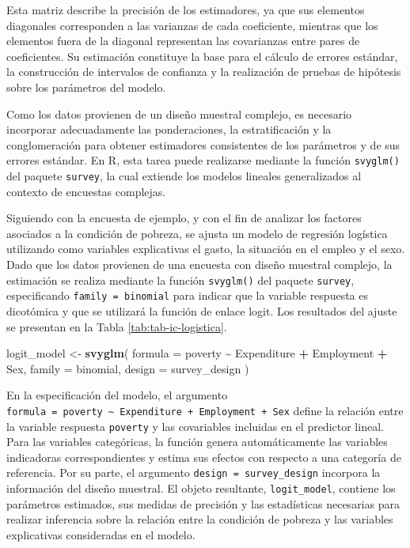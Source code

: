 \documentclass[
  spanish,
  12pt,
]{book}
\newenvironment{Shaded}{\begin{snugshade}}{\end{snugshade}}
\newcommand{\AttributeTok}[1]{\textcolor[rgb]{0.13,0.29,0.53}{#1}}
\newcommand{\FunctionTok}[1]{\textcolor[rgb]{0.13,0.29,0.53}{\textbf{#1}}}
\newcommand{\NormalTok}[1]{#1}
\newcommand{\OtherTok}[1]{\textcolor[rgb]{0.56,0.35,0.01}{#1}}
\newcommand{\SpecialCharTok}[1]{\textcolor[rgb]{0.81,0.36,0.00}{\textbf{#1}}}
\begin{document}
Esta matriz describe la precisión de los estimadores, ya que sus elementos diagonales corresponden a las varianzas de cada coeficiente, mientras que los elementos fuera de la diagonal representan las covarianzas entre pares de coeficientes. Su estimación constituye la base para el cálculo de errores estándar, la construcción de intervalos de confianza y la realización de pruebas de hipótesis sobre los parámetros del modelo.

Como los datos provienen de un diseño muestral complejo, es necesario incorporar adecuadamente las ponderaciones, la estratificación y la conglomeración para obtener estimadores consistentes de los parámetros y de sus errores estándar. En R, esta tarea puede realizarse mediante la función \texttt{svyglm()} del paquete \texttt{survey}, la cual extiende los modelos lineales generalizados al contexto de encuestas complejas.

Siguiendo con la encuesta de ejemplo, y con el fin de analizar los factores asociados a la condición de pobreza, se ajusta un modelo de regresión logística utilizando como variables explicativas el gasto, la situación en el empleo y el sexo. Dado que los datos provienen de una encuesta con diseño muestral complejo, la estimación se realiza mediante la función \texttt{svyglm()} del paquete \texttt{survey}, especificando \texttt{family\ =\ binomial} para indicar que la variable respuesta es dicotómica y que se utilizará la función de enlace logit. Los resultados del ajuste se presentan en la Tabla \ref{tab:tab-ic-logistica}.

\begin{Shaded}
\begin{Highlighting}[]
\NormalTok{logit\_model }\OtherTok{\textless{}{-}} \FunctionTok{svyglm}\NormalTok{(}
  \AttributeTok{formula =}\NormalTok{ poverty }\SpecialCharTok{\textasciitilde{}}\NormalTok{ Expenditure }\SpecialCharTok{+}\NormalTok{ Employment }\SpecialCharTok{+}\NormalTok{ Sex,}
  \AttributeTok{family =}\NormalTok{ binomial,}
  \AttributeTok{design =}\NormalTok{ survey\_design}
\NormalTok{)}
\end{Highlighting}
\end{Shaded}

En la especificación del modelo, el argumento \texttt{formula\ =\ poverty\ \textasciitilde{}\ Expenditure\ +\ Employment\ +\ Sex} define la relación entre la variable respuesta \texttt{poverty} y las covariables incluidas en el predictor lineal. Para las variables categóricas, la función genera automáticamente las variables indicadoras correspondientes y estima sus efectos con respecto a una categoría de referencia. Por su parte, el argumento \texttt{design\ =\ survey\_design} incorpora la información del diseño muestral. El objeto resultante, \texttt{logit\_model}, contiene los parámetros estimados, sus medidas de precisión y las estadísticas necesarias para realizar inferencia sobre la relación entre la condición de pobreza y las variables explicativas consideradas en el modelo.
\end{document}
